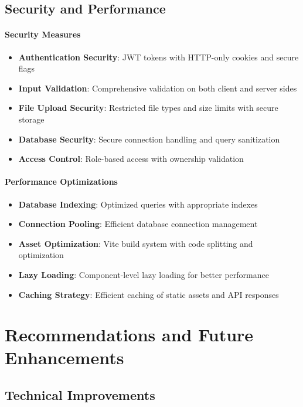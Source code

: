 \documentclass[12pt,a4paper]{article}
\begin{document}
\subsection{Security and Performance}
\label{subsec:security-performance}

\paragraph{Security Measures}
\begin{itemize}
\item \textbf{Authentication Security}: JWT tokens with HTTP-only cookies and secure flags
\item \textbf{Input Validation}: Comprehensive validation on both client and server sides
\item \textbf{File Upload Security}: Restricted file types and size limits with secure storage
\item \textbf{Database Security}: Secure connection handling and query sanitization
\item \textbf{Access Control}: Role-based access with ownership validation
\end{itemize}

\paragraph{Performance Optimizations}
\begin{itemize}
\item \textbf{Database Indexing}: Optimized queries with appropriate indexes
\item \textbf{Connection Pooling}: Efficient database connection management
\item \textbf{Asset Optimization}: Vite build system with code splitting and optimization
\item \textbf{Lazy Loading}: Component-level lazy loading for better performance
\item \textbf{Caching Strategy}: Efficient caching of static assets and API responses
\end{itemize}

\section{Recommendations and Future Enhancements}
\label{sec:recommendations}

\subsection{Technical Improvements}
\label{subsec:technical-improvements}
\end{document}
